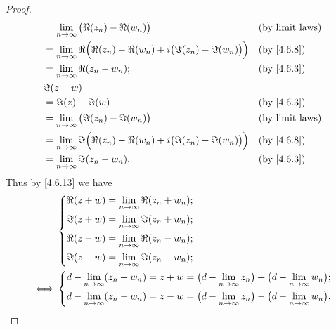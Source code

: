 \begin{proof}
\begin{align*}
     & = \lim_{n \to \infty} \big(\Re(z_n) - \Re(w_n)\big)                                      &  & \text{(by limit laws)} \\
     & = \lim_{n \to \infty} \Re\Big(\Re(z_n) - \Re(w_n) + i \big(\Im(z_n) - \Im(w_n)\big)\Big) &  & \by{4.6.8}             \\
     & = \lim_{n \to \infty} \Re(z_n - w_n);                                                    &  & \by{4.6.3}             \\
     & \Im(z - w)                                                                                                           \\
     & = \Im(z) - \Im(w)                                                                        &  & \by{4.6.3}             \\
     & = \lim_{n \to \infty} \big(\Im(z_n) - \Im(w_n)\big)                                      &  & \text{(by limit laws)} \\
     & = \lim_{n \to \infty} \Im\Big(\Re(z_n) - \Re(w_n) + i \big(\Im(z_n) - \Im(w_n)\big)\Big) &  & \by{4.6.8}             \\
     & = \lim_{n \to \infty} \Im(z_n - w_n).                                                    &  & \by{4.6.3}             \\
  \end{align*}
  Thus by \cref{4.6.13} we have
  \begin{align*}
         & \begin{dcases}
             \Re(z + w) = \lim_{n \to \infty} \Re(z_n + w_n); \\
             \Im(z + w) = \lim_{n \to \infty} \Im(z_n + w_n); \\
             \Re(z - w) = \lim_{n \to \infty} \Re(z_n - w_n); \\
             \Im(z - w) = \lim_{n \to \infty} \Im(z_n - w_n);
           \end{dcases}                                                                             \\
    \iff & \begin{dcases}
             d - \lim_{n \to \infty} (z_n + w_n) = z + w = \big(d - \lim_{n \to \infty} z_n\big) + \big(d - \lim_{n \to \infty} w_n\big); \\
             d - \lim_{n \to \infty} (z_n - w_n) = z - w = \big(d - \lim_{n \to \infty} z_n\big) - \big(d - \lim_{n \to \infty} w_n\big).
           \end{dcases}
  \end{align*}


\end{proof}
